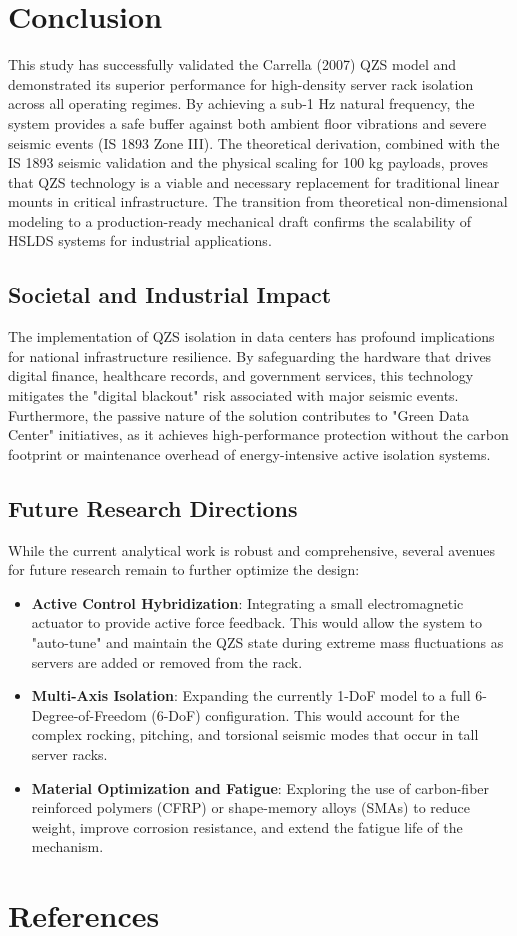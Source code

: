 \documentclass[preprint,12pt]{article}
\begin{document}
\section{Conclusion}
This study has successfully validated the Carrella (2007) QZS model and demonstrated its superior performance for high-density server rack isolation across all operating regimes. By achieving a sub-1 Hz natural frequency, the system provides a safe buffer against both ambient floor vibrations and severe seismic events (IS 1893 Zone III). The theoretical derivation, combined with the IS 1893 seismic validation and the physical scaling for 100 kg payloads, proves that QZS technology is a viable and necessary replacement for traditional linear mounts in critical infrastructure. The transition from theoretical non-dimensional modeling to a production-ready mechanical draft confirms the scalability of HSLDS systems for industrial applications.

\subsection{Societal and Industrial Impact}
The implementation of QZS isolation in data centers has profound implications for national infrastructure resilience. By safeguarding the hardware that drives digital finance, healthcare records, and government services, this technology mitigates the "digital blackout" risk associated with major seismic events. Furthermore, the passive nature of the solution contributes to "Green Data Center" initiatives, as it achieves high-performance protection without the carbon footprint or maintenance overhead of energy-intensive active isolation systems.

\subsection{Future Research Directions}
While the current analytical work is robust and comprehensive, several avenues for future research remain to further optimize the design:
\begin{itemize}
    \item \textbf{Active Control Hybridization}: Integrating a small electromagnetic actuator to provide active force feedback. This would allow the system to "auto-tune" and maintain the QZS state during extreme mass fluctuations as servers are added or removed from the rack.
    \item \textbf{Multi-Axis Isolation}: Expanding the currently 1-DoF model to a full 6-Degree-of-Freedom (6-DoF) configuration. This would account for the complex rocking, pitching, and torsional seismic modes that occur in tall server racks.
    \item \textbf{Material Optimization and Fatigue}: Exploring the use of carbon-fiber reinforced polymers (CFRP) or shape-memory alloys (SMAs) to reduce weight, improve corrosion resistance, and extend the fatigue life of the mechanism.
\end{itemize}



\section*{References}
\nocite{*}


\end{document}
